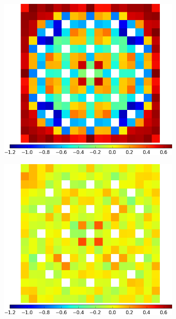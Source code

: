\clearpage

\begin{figure}[h!]
\centering
\begin{subfigure}{0.45\textwidth}
  \centering
  \includegraphics[width=\linewidth]{figures/results/assm-16/no-transform/capt-err-null}
  \caption{}
  \label{fig:chap11-assm-1.6-capt-null}
\end{subfigure}%
\begin{subfigure}{0.45\textwidth}
  \centering
  \includegraphics[width=\linewidth]{figures/results/assm-16/no-transform/capt-err-degenerate}

\end{subfigure}
\end{figure}

